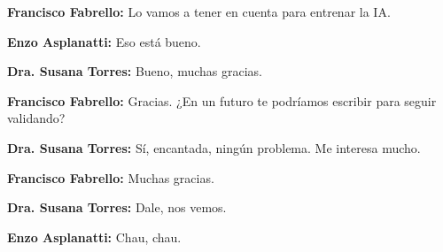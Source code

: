 \noindent\textbf{Francisco Fabrello:} Lo vamos a tener en cuenta para entrenar la IA.

\noindent\textbf{Enzo Asplanatti:} Eso está bueno.

\noindent\textbf{Dra. Susana Torres:} Bueno, muchas gracias.

\noindent\textbf{Francisco Fabrello:} Gracias. ¿En un futuro te podríamos escribir para seguir validando?

\noindent\textbf{Dra. Susana Torres:} Sí, encantada, ningún problema. Me interesa mucho.

\noindent\textbf{Francisco Fabrello:} Muchas gracias.

\noindent\textbf{Dra. Susana Torres:} Dale, nos vemos.

\noindent\textbf{Enzo Asplanatti:} Chau, chau.

